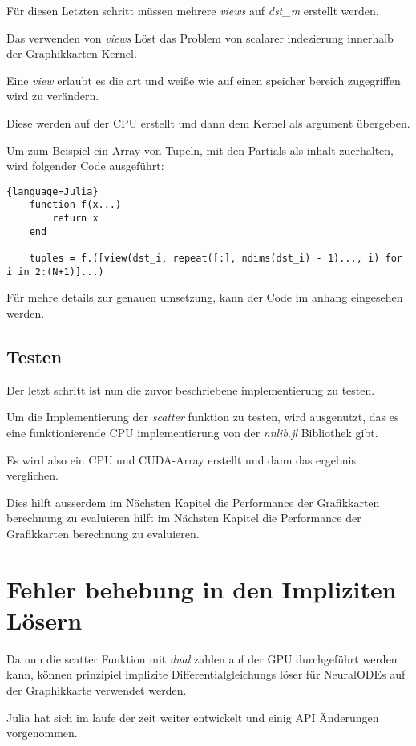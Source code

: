 Für diesen Letzten schritt müssen mehrere \textit{views} auf
\textit{dst_m} erstellt werden.

Das verwenden von \textit{views} Löst das Problem von scalarer indezierung innerhalb der Graphikkarten Kernel. 

Eine \textit{view} erlaubt es die art und weiße wie auf einen speicher bereich zugegriffen wird zu verändern.

Diese werden auf der CPU erstellt und dann dem Kernel als argument übergeben.

Um zum Beispiel ein Array von Tupeln, mit den Partials als inhalt zuerhalten, wird folgender Code ausgeführt:

\begin{lstlisting}{language=Julia}
	function f(x...)
		return x
	end
	
	tuples = f.([view(dst_i, repeat([:], ndims(dst_i) - 1)..., i) for i in 2:(N+1)]...)
\end{lstlisting}


Für mehre details zur genauen umsetzung, kann der Code im anhang eingesehen werden.


\subsection{Testen}

Der letzt schritt ist nun die zuvor beschriebene implementierung zu testen.

Um die Implementierung der \textit{scatter} funktion zu testen, wird ausgenutzt,
das es eine funktionierende CPU implementierung von der \textit{nnlib.jl} Bibliothek gibt.

Es wird also ein CPU und CUDA-Array erstellt und dann das ergebnis verglichen.

Dies hilft ausserdem im Nächsten Kapitel die Performance der Grafikkarten berechnung zu evaluieren hilft im Nächsten Kapitel die Performance der Grafikkarten berechnung zu evaluieren.

\section{ Fehler behebung in den Impliziten Lösern }

Da nun die scatter Funktion mit \textit{dual} zahlen auf der GPU durchgeführt werden kann, 
können prinzipiel implizite Differentialgleichungs löser für 
NeuralODEs auf der Graphikkarte verwendet werden.

Julia hat sich im laufe der zeit weiter entwickelt und einig API Änderungen vorgenommen.


